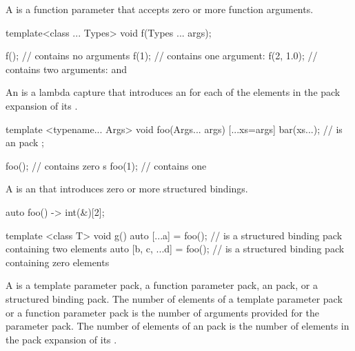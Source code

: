 \pnum
A  is a function parameter
that accepts zero or more function arguments.
\begin{example}
\begin{codeblock}
template<class ... Types> void f(Types ... args);

f();                            //  contains no arguments
f(1);                           //  contains one argument: 
f(2, 1.0);                      //  contains two arguments:  and 
\end{codeblock}
\end{example}

\pnum
An 
is a lambda capture that introduces an 
for each of the elements in the pack expansion of its .
\begin{example}
\begin{codeblock}
template <typename... Args>
void foo(Args... args) {
    [...xs=args]{
        bar(xs...);             //  is an  pack
    };
}

foo();                          //  contains zero s
foo(1);                         //  contains one 
\end{codeblock}
\end{example}

\pnum
A  is an 
that introduces zero or more structured bindings.
\begin{example}
\begin{codeblock}
auto foo() -> int(&)[2];

template <class T>
void g() {
  auto [...a] = foo();          //  is a structured binding pack containing two elements
  auto [b, c, ...d] = foo();    //  is a structured binding pack containing zero elements
}
\end{codeblock}
\end{example}

\pnum
A  is
a template parameter pack,
a function parameter pack,
an  pack, or
a structured binding pack.
The number of elements of a template parameter pack
or a function parameter pack
is the number of arguments provided for the parameter pack.
The number of elements of an  pack
is the number of elements in the pack expansion of its .

